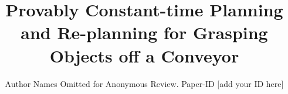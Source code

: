 \documentclass[conference]{IEEEtran}
\begin{document}
\title{Provably Constant-time Planning and Re-planning for Grasping Objects off a Conveyor}

\author{Author Names Omitted for Anonymous Review. Paper-ID [add your ID here]}





% 


\maketitle
\end{document}
